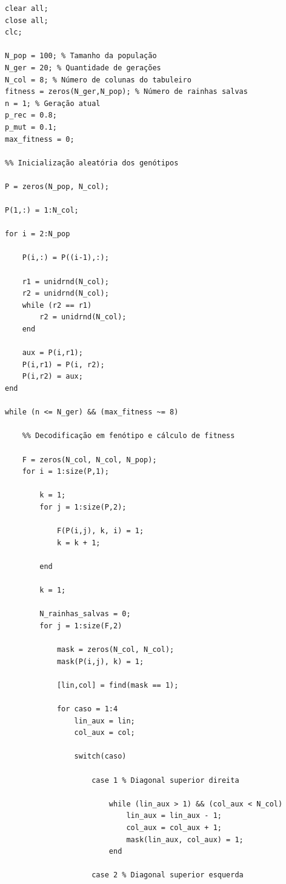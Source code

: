 \documentclass{report}
\begin{document}
	\begin{lstlisting}
clear all;
close all;
clc;

N_pop = 100; % Tamanho da população
N_ger = 20; % Quantidade de gerações
N_col = 8; % Número de colunas do tabuleiro
fitness = zeros(N_ger,N_pop); % Número de rainhas salvas
n = 1; % Geração atual
p_rec = 0.8;
p_mut = 0.1;
max_fitness = 0;

%% Inicialização aleatória dos genótipos

P = zeros(N_pop, N_col);

P(1,:) = 1:N_col;

for i = 2:N_pop

    P(i,:) = P((i-1),:);

    r1 = unidrnd(N_col);
    r2 = unidrnd(N_col);
    while (r2 == r1)
        r2 = unidrnd(N_col);
    end
    
    aux = P(i,r1);
    P(i,r1) = P(i, r2);
    P(i,r2) = aux;
end

while (n <= N_ger) && (max_fitness ~= 8)

    %% Decodificação em fenótipo e cálculo de fitness

    F = zeros(N_col, N_col, N_pop);
    for i = 1:size(P,1);

        k = 1;
        for j = 1:size(P,2);
            
            F(P(i,j), k, i) = 1;
            k = k + 1;
            
        end
        
        k = 1;

        N_rainhas_salvas = 0;
        for j = 1:size(F,2)

            mask = zeros(N_col, N_col);
            mask(P(i,j), k) = 1;
            
            [lin,col] = find(mask == 1);         
            
            for caso = 1:4
                lin_aux = lin;
                col_aux = col;

                switch(caso)
                    
                    case 1 % Diagonal superior direita
                    
                        while (lin_aux > 1) && (col_aux < N_col)
                            lin_aux = lin_aux - 1;
                            col_aux = col_aux + 1;
                            mask(lin_aux, col_aux) = 1;
                        end

                    case 2 % Diagonal superior esquerda
            

\end{lstlisting}
\end{document}
